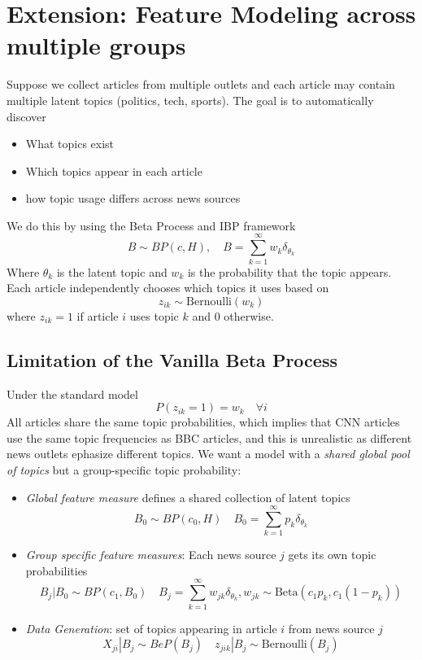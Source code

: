 \documentclass[12pt,oneside]{book}
\numberwithin{equation}{section}
\theoremstyle{definition}
\theoremstyle{plain}
\theoremstyle{remark}
\newcommand{\Bern}{\mathrm{Bernoulli}}
\newcommand{\BetaDist}{\mathrm{Beta}}
\begin{document}
\section*{Extension: Feature Modeling across multiple groups}

Suppose we collect articles from multiple outlets and each article may contain multiple latent topics (politics, tech, sports). The goal is to automatically discover
\begin{itemize}
    \item What topics exist
    \item Which topics appear in each article
    \item how topic usage differs across news sources
\end{itemize}
We do this by using the Beta Process and IBP framework 
\[
    B \sim BP(c, H), \quad B=\sum_{k=1}^\infty w_k \delta_{\theta_k}
\]
Where $\theta_k$ is the latent topic and $w_k$ is the probability that the topic appears. Each article independently chooses which topics it uses based on
\[
    z_{ik} \sim \Bern(w_k)
\]
where $z_{ik}=1$ if article $i$ uses topic $k$ and 0 otherwise.

\subsection*{Limitation of the Vanilla Beta Process}
Under the standard model 
\[
    P(z_{ik}=1)=w_k \quad \forall i
\]
All articles share the same topic probabilities, which implies that CNN articles use the same topic frequencies as BBC articles, and this is unrealistic as different news outlets ephasize different topics. We want a model with a \emph{shared global pool of topics} but a group-specific topic probability:
\begin{itemize}
    \item \emph{Global feature measure} defines a shared collection of latent topics
    \[
        B_0 \sim BP(c_0,H) \quad 
        B_0 = \sum_{k=1}^\infty p_k \delta_{\theta_k}
    \]
    \item \emph{Group specific feature measures}: Each news source $j$ gets its own topic probabilities
    \[
        B_j | B_0 \sim BP(c_1, B_0) \quad
        B_j = \sum_{k=1}^\infty w_{jk} \delta_{\theta_k}, w_{jk}\sim \BetaDist(c_1 p_k, c_1 (1-p_k))
    \]
    \item \emph{Data Generation}: set of topics appearing in article $i$ from news source $j$
    \[
        X_{ji} | B_j \sim BeP(B_j) \quad z_{jik} | B_j \sim \text{Bernoulli}(B_j)
    \]
\end{itemize}
\end{document}
